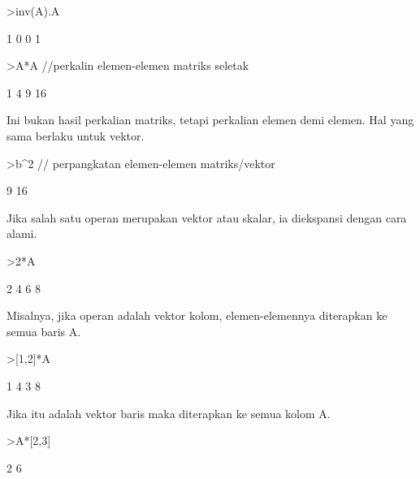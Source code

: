\documentclass[a4paper,10pt]{article}
\begin{document}
\begin{eulernotebook}
\begin{eulercomment}
\begin{eulercomment}
\begin{eulercomment}
\begin{eulercomment}
\begin{eulercomment}
\begin{eulercomment}
\begin{eulerprompt}
>inv(A).A
\end{eulerprompt}
\begin{euleroutput}
              1             0 
              0             1 
\end{euleroutput}
\begin{eulerprompt}
>A*A //perkalin elemen-elemen matriks seletak
\end{eulerprompt}
\begin{euleroutput}
              1             4 
              9            16 
\end{euleroutput}
\begin{eulercomment}
Ini bukan hasil perkalian matriks, tetapi perkalian elemen demi
elemen. Hal yang sama berlaku untuk vektor.
\end{eulercomment}
\begin{eulerprompt}
>b^2 // perpangkatan elemen-elemen matriks/vektor
\end{eulerprompt}
\begin{euleroutput}
              9 
             16 
\end{euleroutput}
\begin{eulercomment}
Jika salah satu operan merupakan vektor atau skalar, ia diekspansi
dengan cara alami.
\end{eulercomment}
\begin{eulerprompt}
>2*A
\end{eulerprompt}
\begin{euleroutput}
              2             4 
              6             8 
\end{euleroutput}
\begin{eulercomment}
Misalnya, jika operan adalah vektor kolom, elemen-elemennya diterapkan
ke semua baris A.
\end{eulercomment}
\begin{eulerprompt}
>[1,2]*A
\end{eulerprompt}
\begin{euleroutput}
              1             4 
              3             8 
\end{euleroutput}
\begin{eulercomment}
Jika itu adalah vektor baris maka diterapkan ke semua kolom A.
\end{eulercomment}
\begin{eulerprompt}
>A*[2,3]
\end{eulerprompt}
\begin{euleroutput}
              2             6 

\end{euleroutput}
\end{eulercomment}
\end{eulercomment}
\end{eulercomment}
\end{eulercomment}
\end{eulercomment}
\end{eulercomment}
\end{eulernotebook}
\end{document}
